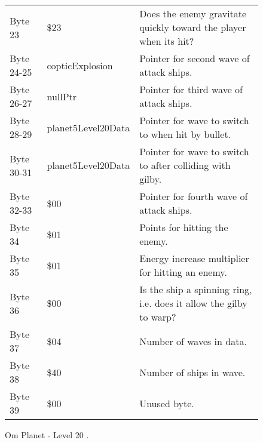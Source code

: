 \begin{figure}[H]
{\begin{adjustbox}{width=12cm}
\begin{tabular}{lll}
 Byte 23    & \$23                & Does the enemy gravitate quickly toward the player when its hit?    \\
 Byte 24-25 & copticExplosion    & Pointer for second wave of attack ships.                            \\
 Byte 26-27 & nullPtr            & Pointer for third wave of attack ships.                             \\
 Byte 28-29 & planet5Level20Data & Pointer for wave to switch to when hit by bullet.                   \\
 Byte 30-31 & planet5Level20Data & Pointer for  wave to switch to after colliding with gilby.          \\
 Byte 32-33 & \$00                & Pointer for fourth wave of attack ships.                            \\
 Byte 34    & \$01                & Points for hitting the enemy.                                       \\
 Byte 35    & \$01                & Energy increase multiplier for hitting an enemy.                    \\
 Byte 36    & \$00                & Is the ship a spinning ring, i.e. does it allow the gilby to warp?  \\
 Byte 37    & \$04                & Number of waves in data.                                            \\
 Byte 38    & \$40                & Number of ships in wave.                                            \\
 Byte 39    & \$00                & Unused byte.                                                        \\
\bottomrule
\end{tabular}

  \end{adjustbox}

  }\caption*{Om Planet - Level 20
.}
\end{figure}
